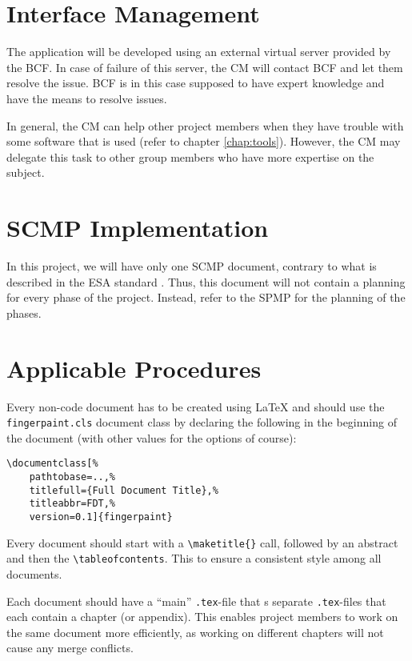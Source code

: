 \section{Interface Management}
\label{sec:interfacemanagement}
The \projectname{} application will be developed using an external virtual server provided by the BCF. In case of failure of this server, the CM will contact BCF and let them resolve the issue. BCF is in this case supposed to have expert knowledge and have the means to resolve issues.

In general, the CM can help other project members when they have trouble with some software that is used (refer to chapter \ref{chap:tools}). However, the CM may delegate this task to other group members who have more expertise on the subject.

\section{SCMP Implementation}
In this project, we will have only one SCMP document, contrary to what is described in the ESA standard \cite{esa}. Thus, this document will not contain a planning for every phase of the project. Instead, refer to the SPMP for the planning of the phases.

\section{Applicable Procedures}
Every non-code document has to be created using \LaTeX{} and should use the \texttt{fingerpaint.cls} document class by declaring the following in the beginning of the document (with other values for the options of course):
\begin{center}\begin{minipage}{0.5\textwidth}\begin{verbatim}
\documentclass[%
    pathtobase=..,%
    titlefull={Full Document Title},%
    titleabbr=FDT,%
    version=0.1]{fingerpaint}
\end{verbatim}\end{minipage}\end{center}
Every document should start with a \verb|\maketitle{}| call, followed by an abstract and then the \verb|\tableofcontents|. This to ensure a consistent style among all documents.

Each document should have a ``main'' \texttt{.tex}-file that \verb||s separate \texttt{.tex}-files that each contain a chapter (or appendix). This enables project members to work on the same document more efficiently, as working on different chapters will not cause any merge conflicts.

